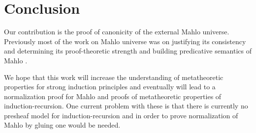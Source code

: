 \chapter{Conclusion}

Our contribution is the proof of canonicity of the external Mahlo universe. Previously most of the work on Mahlo universe was on justifying its consistency and determining its proof-theoretic strength \cite{setzer1996model, setzer2000extending, setzer2005universes} and building predicative semantics of Mahlo \cite{dybjer2023extended}.

We hope that this work will increase the understanding of metatheoretic properties for strong induction principles and eventually will lead to a normalization proof for Mahlo and proofs of metatheoretic properties of induction-recursion. One current problem with these is that there is currently no presheaf model for induction-recursion and in order to prove normalization of Mahlo by gluing one would be needed.
